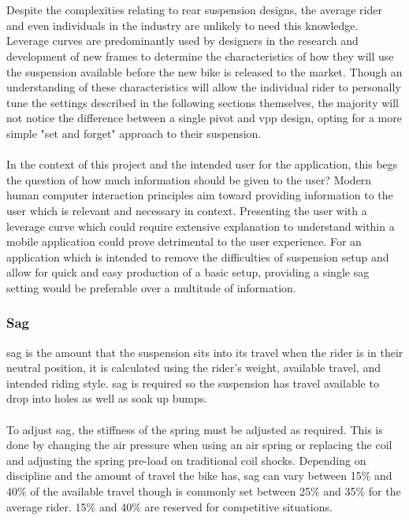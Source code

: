 		\\\\
		Despite the complexities relating to rear suspension designs, the average rider and even individuals in the industry are unlikely to need this knowledge. Leverage curves are predominantly used by designers in the research and development of new frames to determine the characteristics of how they will use the suspension available before the new bike is released to the market. Though an understanding of these characteristics will allow the individual rider to personally tune the settings described in the following sections themselves, the majority will not notice the difference between a single pivot and \gls{vpp} design, opting for a more simple "set and forget" approach to their suspension.
		\\\\
		In the context of this project and the intended user for the application, this begs the question of how much information should be given to the user? Modern human computer interaction principles aim toward providing information to the user which is relevant and necessary in context. Presenting the user with a leverage curve which could require extensive explanation to understand within a mobile application could prove detrimental to the user experience. For an application which is intended to remove the difficulties of suspension setup and allow for quick and easy production of a basic setup, providing a single sag setting would be preferable over a multitude of information. 
	\subsubsection{Sag}
		\Gls{sag} is the amount that the suspension sits into its travel when the rider is in their neutral position, it is calculated using the rider's weight, available \gls{travel}, and intended riding style. \Gls{sag} is required so the suspension has travel available to drop into holes as well as soak up bumps. 
		\\\\
		To adjust \gls{sag}, the stiffness of the spring must be adjusted as required. This is done by changing the air pressure when using an air spring or replacing the coil and adjusting the spring pre-load on traditional coil \glspl{shock}. Depending on discipline and the amount of \gls{travel} the bike has, \gls{sag} can vary between 15\% and 40\% of the available travel though is commonly set between 25\% and 35\% for the average rider. 15\% and 40\% are reserved for competitive situations. 
